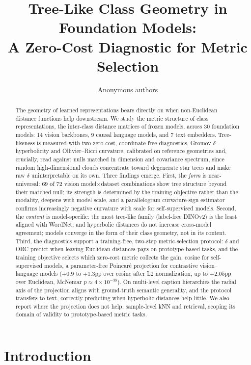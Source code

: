 \documentclass{article} %
\title{Tree-Like Class Geometry in Foundation Models: \\ A Zero-Cost Diagnostic for Metric Selection}
\author{Anonymous authors}
\begin{document}
\maketitle

\begin{abstract}
The geometry of learned representations bears directly on when non-Euclidean distance functions help downstream. We study the metric structure of class representations, the inter-class distance matrices of frozen models, across 30 foundation models: 14 vision backbones, 9 causal language models, and 7 text embedders. Tree-likeness is measured with two zero-cost, coordinate-free diagnostics, Gromov $\delta$-hyperbolicity and Ollivier--Ricci curvature, calibrated on reference geometries and, crucially, read against nulls matched in dimension and covariance spectrum, since random high-dimensional clouds concentrate toward degenerate star trees and make raw $\delta$ uninterpretable on its own. Three findings emerge. First, the \emph{form} is near-universal: 69 of 72 vision model$\times$dataset combinations show tree structure beyond their matched null; its strength is determined by the training objective rather than the modality, deepens with model scale, and a parallelogram curvature-sign estimator confirms increasingly negative curvature with scale for self-supervised models. Second, the \emph{content} is model-specific: the most tree-like family (label-free DINOv2) is the least aligned with WordNet, and hyperbolic distances do not increase cross-model agreement; models converge in the form of their class geometry, not in its content. Third, the diagnostics support a training-free, two-step metric-selection protocol: $\delta$ and ORC predict when leaving Euclidean distances pays on prototype-based tasks, and the training objective selects which zero-cost metric collects the gain, cosine for self-supervised models, a parameter-free Poincar\'{e} projection for contrastive vision--language models ($+0.9$ to $+1.3$pp over cosine after L2 normalization, up to $+2.05$pp over Euclidean, McNemar $p \approx 4\times10^{-38}$). On multi-level caption hierarchies the radial axis of the projection aligns with ground-truth semantic generality, and the protocol transfers to text, correctly predicting when hyperbolic distances help little. We also report where the projection does not help, sample-level kNN and retrieval, scoping its domain of validity to prototype-based metric tasks.
\end{abstract}

\section{Introduction}
\end{document}
